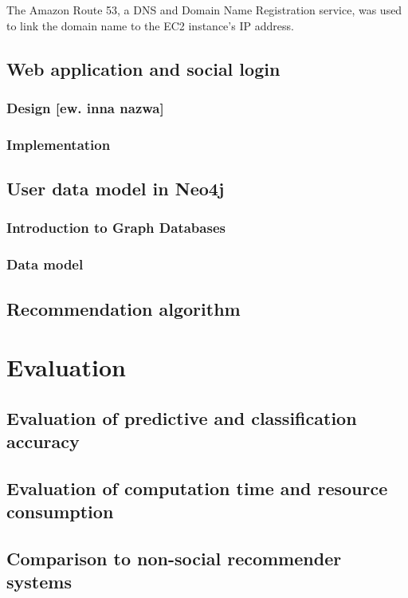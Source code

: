 \documentclass[12pt]{report}
\begin{document}
The Amazon Route 53, a DNS and Domain Name Registration service, was used to link the domain name to the EC2 instance's IP address.

\section{Web application and social login}
\subsection{Design [ew. inna nazwa]}

\subsection{Implementation}

%
\section{User data model in Neo4j}

\subsection{Introduction to Graph Databases}

\subsection{Data model}

\section{Recommendation algorithm}

\chapter{Evaluation}
\section{Evaluation of predictive and classification accuracy}
\section{Evaluation of computation time and resource consumption}
\section{Comparison to non-social recommender systems}
\end{document}
